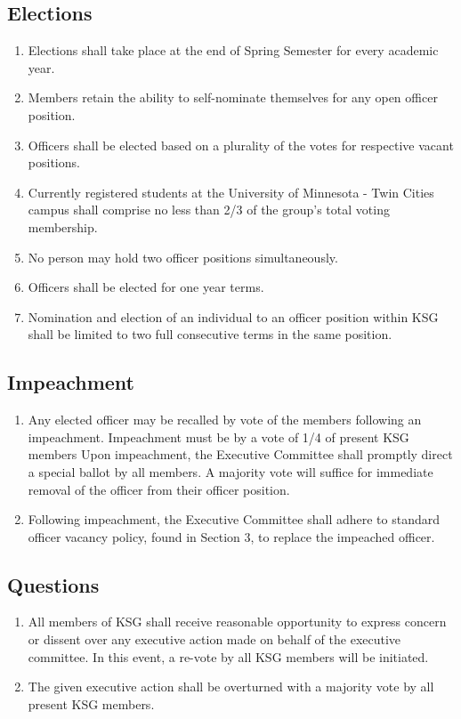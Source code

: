 \documentclass[12pt,executivepaper]{article}
\begin{document}
\subsection{Elections}
\begin{enumerate}
    \item Elections shall take place at the end of Spring Semester for every academic year.
    \item Members retain the ability to self-nominate themselves for any open officer position.
    \item Officers shall be elected based on a plurality of the votes for respective vacant
          positions.
    \item Currently registered students at the University of Minnesota - Twin Cities campus
          shall comprise no less than 2/3 of the group's total voting membership. 
    \item No person may hold two officer positions simultaneously.
    \item Officers shall be elected for one year terms.
    \item Nomination and election of an individual to an officer position within KSG shall be
          limited to two full consecutive terms in the same position.
\end{enumerate}

\subsection{Impeachment}
\begin{enumerate}
    \item Any elected officer may be recalled by vote of the members following an
          impeachment. Impeachment must be by a vote of 1/4 of present KSG members
          Upon impeachment, the Executive Committee shall promptly direct a special
          ballot by all members. A majority vote will suffice for immediate removal
          of the officer from their officer position.
    \item Following impeachment, the Executive Committee shall adhere to
          standard officer vacancy policy, found in Section 3, to replace the
          impeached officer.
\end{enumerate}

\subsection{Questions}
\begin{enumerate}
    \item All members of KSG shall receive reasonable opportunity to express concern
          or dissent over any executive action made on behalf of the executive committee.
          In this event, a re-vote by all KSG members will be initiated.
    \item The given executive action shall be overturned with a majority vote by
          all present KSG members.
\end{enumerate}
\end{document}
